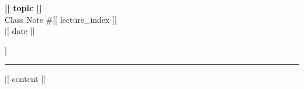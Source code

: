 \documentclass[11pt,a4paper]{article}
\begin{document}
\begin{titlepage}
\centering
\vspace*{2cm}
{\color{navy}\bfseries\Huge [[ topic ]]}\\[0.2cm]
{\color{teal}\Large Class Note \#[[ lecture_index ]]}\\[0.2cm]
{\color{gold!70!black}\small [[ date ]]}\\[1cm]
\begin{tcolorbox}[colback=lightgold, colframe=gold, width=0.7\textwidth, arc=3pt]
\centering [[ subject ]]
\end{tcolorbox}
\vfill
{\color{gold}\rule{0.5\textwidth}{1.5pt}}
\end{titlepage}

[[ content ]]
\end{document}
